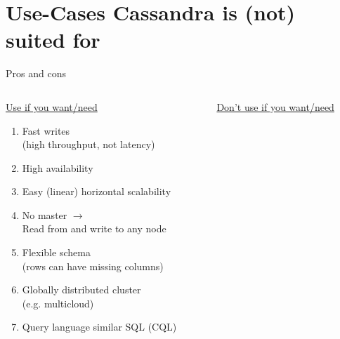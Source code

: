 \documentclass[
  10pt
]{beamer}
\begin{document}
\section{Use-Cases Cassandra is (not) suited for}  %
\begin{frame}{Pros and cons}
  \begin{columns}[T]
    \begin{column}{0.55\textwidth}
      \underline{Use if you want/need}

      \begin{enumerate}[\textbf{\textcolor{aswe-data}{+}}]
        \item<2-> Fast writes \\ (high throughput, not latency)
        \item<3-> High availability
        \item<4-> Easy (linear) horizontal scalability
        \item<5-> No master $\rightarrow$ \\ Read from and write to any node
        \item<6-> Flexible schema \\ (rows can have missing columns)
        \item<7-> Globally distributed cluster \\ (e.g. multicloud)
        \item<8-> Query language similar SQL (CQL)
      \end{enumerate}
    \end{column}

    \begin{column}{0.45\textwidth}
      \underline{Don't use if you want/need}


\end{column}
\end{columns}
\end{frame}
\end{document}
